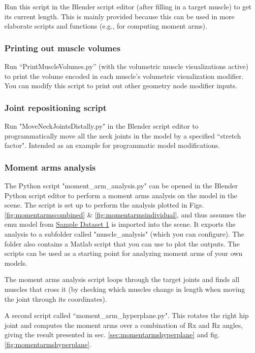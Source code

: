 \documentclass{article}
\begin{document}
Run this script in the Blender script editor (after filling in a target muscle) to get its current length. This is mainly provided because this can be used in more elaborate scripts and functions (e.g., for computing moment arms).

\subsubsection{Printing out muscle volumes}

Run ``PrintMuscleVolumes.py'' (with the volumetric muscle visualizations active) to print the volume encoded in each muscle's volumetric visualization modifier. You can modify this script to print out other geometry node modifier inputs.

\subsubsection{Joint repositioning script}

Run "MoveNeckJointsDistally.py" in the Blender script editor to programmatically move all the neck joints in the model by a specified ``stretch factor". Intended as an example for programmatic model modifications.


\subsubsection{Moment arms analysis}
The Python script "moment\_arm\_analysis.py" can be opened in the Blender Python script editor to perform a moment arms analysis on the model in the scene. The script is set up to perform the analysis plotted in Figs. \ref{fig:momentarmscombined} \& \ref{fig:momentarmsindividual}, and thus assumes the emu model from \href{https://github.com/PashavanBijlert/MuSkeMo/releases/tag/v0.x-sampledataset1}{Sample Dataset 1} is imported into the scene. It exports the analysis to a subfolder called "muscle\_analysis" (which you can configure). The folder also contains a Matlab script that you can use to plot the outputs. The scripts can be used as a starting point for analyzing moment arms of your own models.

The moment arms analysis script loops through the target joints and finds all muscles that cross it (by checking which muscles change in length when moving the joint through its coordinates).

A second script called ``moment\_arm\_hyperplane.py". This rotates the right hip joint and computes the moment arms over a combination of Rx and Rz angles, giving the result presented in sec. \ref{sec:momentarmshyperplane} and fig. \ref{fig:momentarmshyperplane}.
\end{document}
